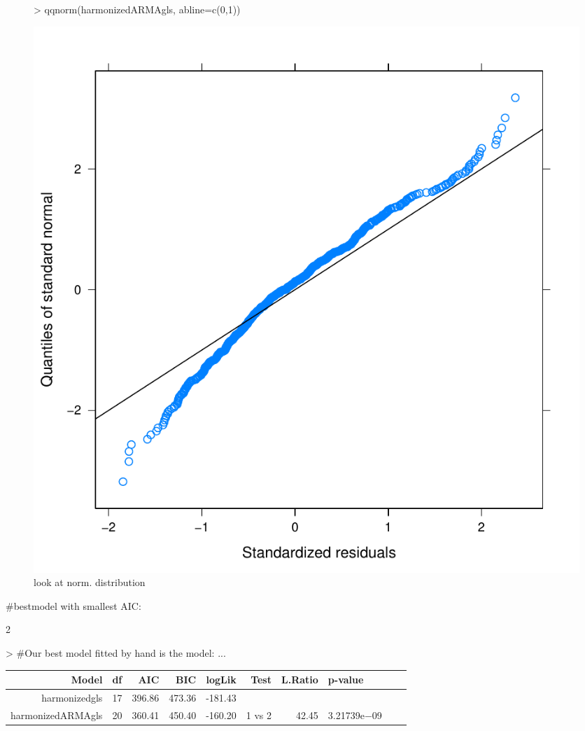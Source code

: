 \documentclass[11pt, a4paper]{article} %
\begin{document}
\begin{figure}[H]
\centering
\begin{Schunk}
\begin{Sinput}
> qqnorm(harmonizedARMAgls, abline=c(0,1))
\end{Sinput}
\end{Schunk}
\includegraphics{alleselena-046}
\caption{look at norm. distribution}
\label{finalgls_norm}
\end{figure}

\linebreak
#bestmodel with smallest AIC: \\
\begin{Schunk}
\begin{Soutput}
[1] 2
\end{Soutput}
\begin{Sinput}
> #Our best model fitted by hand is the model:  ...
\end{Sinput}
\end{Schunk}

\begin{table}[ht]
\centering
\begin{tabular}{rlrrrrrlrr}
  \hline
 Model & df & AIC & BIC & logLik & Test & L.Ratio & p-value \\ 
  \hline
harmonizedgls  &    17 & 396.86 & 473.36 & -181.43 &  &  &  \\ 
  harmonizedARMAgls  &    20 & 360.41 & 450.40 & -160.20 & 1 vs 2 & 42.45 & 3.21739e$-$09 \\ 
   \hline
\end{tabular}
\end{table}
\end{document}
